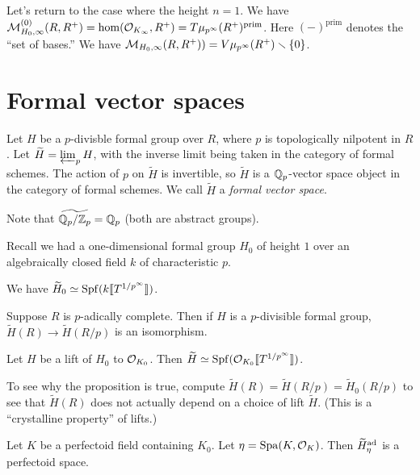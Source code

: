 \documentclass{article}
\begin{document}
Let's return to the case where the height $n=1$. We have 
$\mathcal{M}_{H_0,\infty}^{(0)}(R,R^+) = \hom(\mathcal{O}_{K_\infty}, R^+) = T \mu_{p^\infty}(R^+)^\text{prim}$. Here $(-)^\text{prim}$ denotes the ``set of bases.'' 
We have $\mathcal{M}_{H_0,\infty}(R,R^+)) = V \mu_{p^\infty}(R^+)\smallsetminus \{0\}$. 





\section{Formal vector spaces}

Let $H$ be a $p$-divisble formal group over $R$, where $p$ is topologically 
nilpotent in $R$. Let $\widetilde H=\varprojlim_p H$, with the inverse 
limit being taken in the category of formal schemes. The action of $p$ on 
$\widetilde H$ is invertible, so $\widetilde H$ is a $\mathbb{Q}_p$-vector space 
object in the category of formal schemes. We call $\widetilde H$ a 
\emph{formal vector space}. 

Note that $\widetilde{\mathbb{Q}_p/\mathbb{Z}_p} = \mathbb{Q}_p$ (both are abstract groups). 

Recall we had a one-dimensional formal group $H_0$ of height $1$ over an 
algebraically closed field $k$ of characteristic $p$. 

\begin{proposition}
We have $\widetilde H_0\simeq \operatorname{Spf}(k\llbracket {T^{1/p^\infty}} \rrbracket)$. 
\end{proposition}

\begin{proposition}
Suppose $R$ is $p$-adically complete. Then if $H$ is a $p$-divisible formal 
group, $\widetilde H(R)\to \widetilde H(R/p)$ is an isomorphism. 
\end{proposition}

\begin{proposition}
Let $H$ be a lift of $H_0$ to $\mathcal{O}_{K_0}$. Then 
$\widetilde H\simeq \operatorname{Spf}(\mathcal{O}_{K_0}\llbracket {T^{1/p^\infty}} \rrbracket)$. 
\end{proposition}

To see why the proposition is true, compute 
$\widetilde H(R) = \widetilde H(R/p) = \widetilde H_0(R/p)$ to see that 
$\widetilde H(R)$ does not actually depend on a choice of lift $\widetilde H$. (This 
is a ``crystalline property'' of lifts.)


\begin{corollary}
Let $K$ be a perfectoid field containing $K_0$. Let $\eta=\operatorname{Spa}(K,\mathcal{O}_K)$. Then 
$\widetilde H_\eta^{\textnormal{ad}}$ is a perfectoid space. 
\end{corollary}
\end{document}

